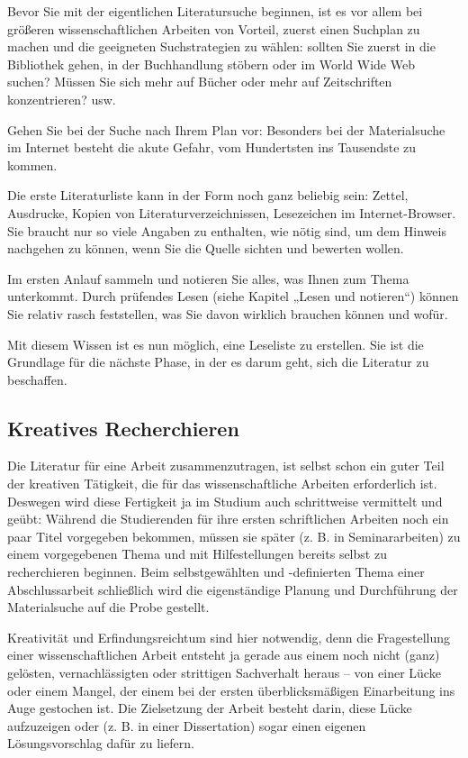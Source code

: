 \documentclass[]{book}
\theoremstyle{definition}
\theoremstyle{definition}
\theoremstyle{definition}
\theoremstyle{remark}
\begin{document}
Bevor Sie mit der eigentlichen Literatursuche beginnen, ist es vor allem
bei größeren wissenschaftlichen Arbeiten von Vorteil, zuerst einen
Suchplan zu machen und die geeigneten Suchstrategien zu wählen: sollten
Sie zuerst in die Bibliothek gehen, in der Buchhandlung stöbern oder im
World Wide Web suchen? Müssen Sie sich mehr auf Bücher oder mehr auf
Zeitschriften konzentrieren? usw.

Gehen Sie bei der Suche nach Ihrem Plan vor: Besonders bei der
Materialsuche im Internet besteht die akute Gefahr, vom Hundertsten ins
Tausendste zu kommen.

Die erste Literaturliste kann in der Form noch ganz beliebig sein:
Zettel, Ausdrucke, Kopien von Literaturverzeichnissen, Lesezeichen im
Internet-Browser. Sie braucht nur so viele Angaben zu enthalten, wie
nötig sind, um dem Hinweis nachgehen zu können, wenn Sie die Quelle
sichten und bewerten wollen.

Im ersten Anlauf sammeln und notieren Sie alles, was Ihnen zum Thema
unterkommt. Durch prüfendes Lesen (siehe Kapitel „Lesen und notieren``)
können Sie relativ rasch feststellen, was Sie davon wirklich brauchen
können und wofür.

Mit diesem Wissen ist es nun möglich, eine Leseliste zu erstellen. Sie
ist die Grundlage für die nächste Phase, in der es darum geht, sich die
Literatur zu beschaffen.

\subsection{Kreatives Recherchieren}\label{kreatives-recherchieren}

Die Literatur für eine Arbeit zusammenzutragen, ist selbst schon ein
guter Teil der kreativen Tätigkeit, die für das wissenschaftliche
Arbeiten erforderlich ist. Deswegen wird diese Fertigkeit ja im Studium
auch schrittweise vermittelt und geübt: Während die Studierenden für
ihre ersten schriftlichen Arbeiten noch ein paar Titel vorgegeben
bekommen, müssen sie später (z. B. in Seminararbeiten) zu einem
vorgegebenen Thema und mit Hilfestellungen bereits selbst zu
recherchieren beginnen. Beim selbstgewählten und -definierten Thema
einer Abschlussarbeit schließlich wird die eigenständige Planung und
Durchführung der Materialsuche auf die Probe gestellt.

Kreativität und Erfindungsreichtum sind hier notwendig, denn die
Fragestellung einer wissenschaftlichen Arbeit entsteht ja gerade aus
einem noch nicht (ganz) gelösten, vernachlässigten oder strittigen
Sachverhalt heraus -- von einer Lücke oder einem Mangel, der einem bei
der ersten überblicksmäßigen Einarbeitung ins Auge gestochen ist. Die
Zielsetzung der Arbeit besteht darin, diese Lücke aufzuzeigen oder (z.
B. in einer Dissertation) sogar einen eigenen Lösungsvorschlag dafür zu
liefern.
\end{document}
